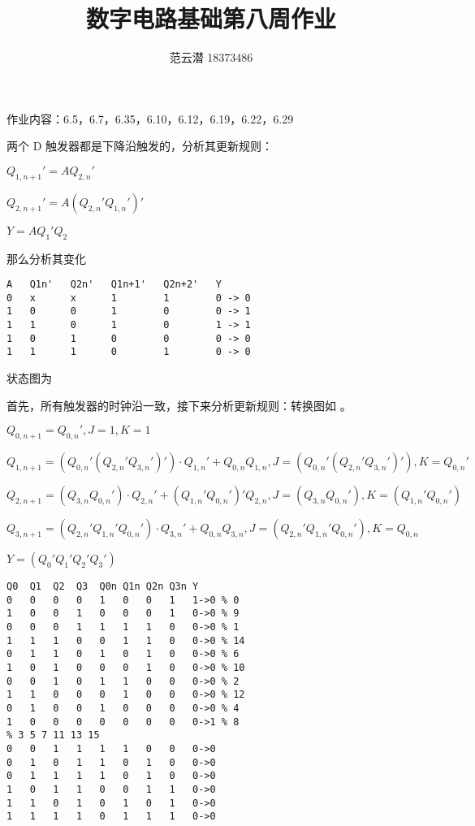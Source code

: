 \documentclass[lang=cn,11pt,a4paper,cite=authoryear]{elegantpaper}
\title{数字电路基础\quad 第八周作业}
\author{范云潜 18373486}
\institute{微电子学院 184111 班}
\date{\zhtoday}
\begin{document}
\maketitle

作业内容：6.5，6.7，6.35，6.10，6.12，6.19，6.22，6.29 


两个 D 触发器都是下降沿触发的，分析其更新规则：

\(Q_{1,n+1}' = A Q_{2,n}'\) 

\(Q_{2,n+1}' = A (Q_{2,n}' Q_{1,n}')'\)

\(Y = A Q_1' Q_2\)

那么分析其变化

\begin{lstlisting}
A   Q1n'   Q2n'   Q1n+1'   Q2n+2'   Y 
0   x      x      1        1        0 -> 0 
1   0      0      1        0        0 -> 1
1   1      0      1        0        1 -> 1 
1   0      1      0        0        0 -> 0 
1   1      1      0        1        0 -> 0
\end{lstlisting}

状态图为 



首先，所有触发器的时钟沿一致，接下来分析更新规则：转换图如  。

\(Q_{0,n+1} = Q_{0,n}', J = 1, K = 1\)

\(Q_{1,n+1} = (Q_{0,n}'(Q_{2,n}'Q_{3,n}')') \cdot Q_{1,n}' + Q_{0,n}Q_{1,n}, J = (Q_{0,n}'(Q_{2,n}'Q_{3,n}')'), K = Q_{0,n}'\)

\(Q_{2,n+1} = (Q_{3,n} Q_{0,n}') \cdot Q_{2,n}' + (Q_{1,n}' Q_{0,n}')' Q_{2,n}, J = (Q_{3,n} Q_{0,n}') , K = (Q_{1,n}' Q_{0,n}')\)

\(Q_{3,n+1} = (Q_{2,n}' Q_{1,n}' Q_{0,n}') \cdot Q_{3,n}' + Q_{0,n} Q_{3,n}, J =  (Q_{2,n}' Q_{1,n}' Q_{0,n}'), K = Q_{0,n}\)

\(Y = (Q_{0}' Q_{1}' Q_{2}' Q_{3}')\) 


\begin{lstlisting}
Q0  Q1  Q2  Q3  Q0n Q1n Q2n Q3n Y
0   0   0   0   1   0   0   1   1->0 % 0
1   0   0   1   0   0   0   1   0->0 % 9
0   0   0   1   1   1   1   0   0->0 % 1
1   1   1   0   0   1   1   0   0->0 % 14
0   1   1   0   1   0   1   0   0->0 % 6
1   0   1   0   0   0   1   0   0->0 % 10
0   0   1   0   1   1   0   0   0->0 % 2
1   1   0   0   0   1   0   0   0->0 % 12
0   1   0   0   1   0   0   0   0->0 % 4
1   0   0   0   0   0   0   0   0->1 % 8 
% 3 5 7 11 13 15
0   0   1   1   1   1   0   0   0->0
0   1   0   1   1   0   1   0   0->0
0   1   1   1   1   0   1   0   0->0
1   0   1   1   0   0   1   1   0->0
1   1   0   1   0   1   0   1   0->0
1   1   1   1   0   1   1   1   0->0
\end{lstlisting}
\end{document}
